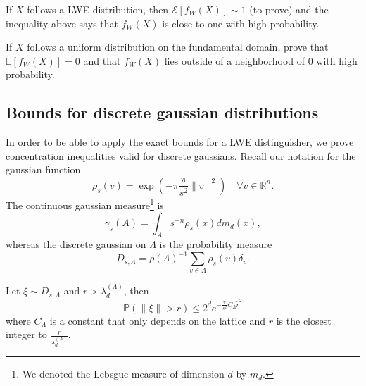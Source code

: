 If $X$ follows a LWE-distribution, then $\mathcal E[f_W(X)] \sim 1$ (to prove) and the inequality above says that $f_W(X)$ is close to one with high probability.

If $X$ follows a uniform distribution on the fundamental domain, prove that $\mathbb E[f_W(X)]= 0$ and that $f_W(X)$ lies outside of a neighborhood of $0$ with high probability.

\subsection{Bounds for discrete gaussian distributions}

In order to be able to apply the exact bounds for a LWE distinguisher, we prove concentration inequalities valid for discrete gaussians. Recall our notation for the gaussian function 
$$\rho_s(v)=\exp(-\pi \frac{\pi}{s^2}\|v\|^2 )\quad \forall v\in \mathbb R^n.$$
The continuous gaussian measure\footnote{We denoted the Lebsgue measure of dimension $d$ by $m_d$.} is 
$$\gamma_s(A) =  \int_A s^{-n}\rho_s(x)dm_d(x) ,$$
whereas the discrete gaussian on $\Lambda$ is the probability measure 
$$D_{s,\Lambda} = \rho(\Lambda )^{-1} \sum_{v\in \Lambda} \rho_s(v)\delta_v. $$

\begin{proposition}
Let $\xi \sim D_{s,\Lambda}$ and $r > \lambda_d^{(\Lambda)}$, then 
$$\mathbb P(\|\xi \|> r )\leq 2^de^{-\frac{\pi}{s^2} C_\Lambda \tilde r^2}$$
where $C_\Lambda$ is a constant that only depends on the lattice and $\tilde r$ is the closest integer to $\frac{r}{\lambda_d^{(\Lambda)}}$.
\end{proposition} 

